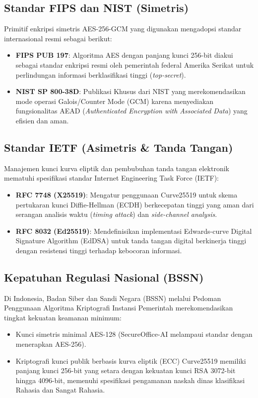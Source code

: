 \documentclass[conference]{IEEEtran}
\begin{document}
\subsection{Standar FIPS dan NIST (Simetris)}
Primitif enkripsi simetris AES-256-GCM yang digunakan mengadopsi standar internasional resmi sebagai berikut:
\begin{itemize}
    \item \textbf{FIPS PUB 197}: Algoritma AES dengan panjang kunci 256-bit diakui sebagai standar enkripsi resmi oleh pemerintah federal Amerika Serikat untuk perlindungan informasi berklasifikasi tinggi (\textit{top-secret}).
    \item \textbf{NIST SP 800-38D}: Publikasi Khusus dari NIST yang merekomendasikan mode operasi Galois/Counter Mode (GCM) karena menyediakan fungsionalitas AEAD (\textit{Authenticated Encryption with Associated Data}) yang efisien dan aman.
\end{itemize}

\subsection{Standar IETF (Asimetris \& Tanda Tangan)}
Manajemen kunci kurva eliptik dan pembubuhan tanda tangan elektronik mematuhi spesifikasi standar Internet Engineering Task Force (IETF):
\begin{itemize}
    \item \textbf{RFC 7748 (X25519)}: Mengatur penggunaan Curve25519 untuk skema pertukaran kunci Diffie-Hellman (ECDH) berkecepatan tinggi yang aman dari serangan analisis waktu (\textit{timing attack}) dan \textit{side-channel analysis}.
    \item \textbf{RFC 8032 (Ed25519)}: Mendefinisikan implementasi Edwards-curve Digital Signature Algorithm (EdDSA) untuk tanda tangan digital berkinerja tinggi dengan resistensi tinggi terhadap kebocoran informasi.
\end{itemize}

\subsection{Kepatuhan Regulasi Nasional (BSSN)}
Di Indonesia, Badan Siber dan Sandi Negara (BSSN) melalui Pedoman Penggunaan Algoritma Kriptografi Instansi Pemerintah merekomendasikan tingkat kekuatan keamanan minimum:
\begin{itemize}
    \item Kunci simetris minimal AES-128 (SecureOffice-AI melampaui standar dengan menerapkan AES-256).
    \item Kriptografi kunci publik berbasis kurva eliptik (ECC) Curve25519 memiliki panjang kunci 256-bit yang setara dengan kekuatan kunci RSA 3072-bit hingga 4096-bit, memenuhi spesifikasi pengamanan naskah dinas klasifikasi Rahasia dan Sangat Rahasia.
\end{itemize}
\end{document}
